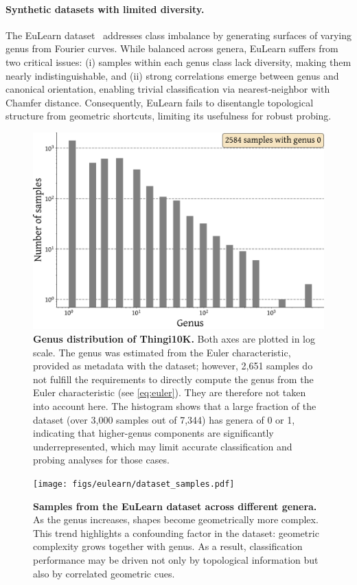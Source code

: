 \paragraph{Synthetic datasets with limited diversity.} 
The EuLearn dataset~\cite{eulearn} addresses class imbalance by generating surfaces of varying genus from Fourier curves. While balanced across genera, EuLearn suffers from two critical issues: (i) samples within each genus class lack diversity, making them nearly indistinguishable, and (ii) strong correlations emerge between genus and canonical orientation, enabling trivial classification via nearest-neighbor with Chamfer distance. Consequently, EuLearn fails to disentangle topological structure from geometric shortcuts, limiting its usefulness for robust probing.

\begin{figure}[h]
  \centering
  \includegraphics[width=0.5\linewidth]{figs/topogen/thingi_genus_hist.pdf}
   \caption{\textbf{Genus distribution of Thingi10K.} Both axes are plotted in log scale. The genus was estimated from the Euler characteristic, provided as metadata with the dataset; however, 2,651 samples do not fulfill the requirements to directly compute the genus from the Euler characteristic (see \ref{eq:euler}). They are therefore not taken into account here. The histogram shows that a large fraction of the dataset (over 3,000 samples out of 7,344) has genera of 0 or 1, indicating that higher-genus components are significantly underrepresented, which may limit accurate classification and probing analyses for those cases.}
   \label{fig:thingi-genus}
\end{figure}

\begin{figure}[h]
  \centering
  \texttt{[image: figs/eulearn/dataset\_samples.pdf]}
   \caption{\textbf{Samples from the EuLearn dataset across different genera.} As the genus increases, shapes become geometrically more complex. This trend highlights a confounding factor in the dataset: geometric complexity grows together with genus. As a result, classification performance may be driven not only by topological information but also by correlated geometric cues.}
   \label{fig:eulearn-samples}
\end{figure}



